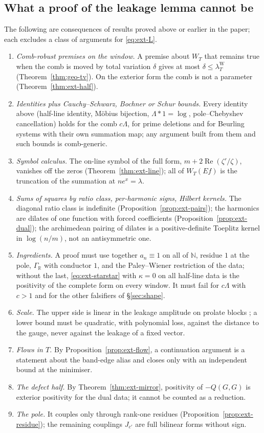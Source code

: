 \documentclass[11pt]{amsart}
\theoremstyle{definition}
\theoremstyle{remark}
\newcommand{\R}{\mathbb R}
\newcommand{\N}{\mathbb N}
\newcommand{\Rel}{\operatorname{Re}}
\newcommand{\lamW}{\lambda^{\mathrm W}_T}
\begin{document}
\subsection{What a proof of the leakage lemma cannot be}\label{subsec:ext-constraints}

The following are consequences of results proved above or earlier in the paper; each excludes a class of arguments for
\eqref{eq:ext-L}.
\begin{enumerate}
\item \emph{Comb-robust premises on the window.} A premise about $W_T$ that remains true when the comb is moved by total
variation $\delta$ gives at most $\delta\le\lamW$ (Theorem~\ref{thm:geo-tv}). On the exterior form the comb is not a parameter
(Theorem~\ref{thm:ext-half}).
\item \emph{Identities plus Cauchy--Schwarz, Bochner or Schur bounds.} Every identity above (half-line identity, M\"obius
bijection, $\Lambda*1=\log$, pole--Chebyshev cancellation) holds for the comb $c\Lambda$, for prime deletions and for
Beurling systems with their own summation map; any argument built from them and such bounds is comb-generic.
\item \emph{Symbol calculus.} The on-line symbol of the full form, $m+2\Rel(\zeta'/\zeta)$, vanishes off the zeros
(Theorem~\ref{thm:ext-line}); all of $W_T(Ef)$ is the truncation of the summation at $ne^x=\lambda$.
\item \emph{Sums of squares by ratio class, per-harmonic signs, Hilbert kernels.} The diagonal ratio class is indefinite
(Proposition~\ref{prop:ext-pairs}); the harmonics are dilates of one function with forced coefficients
(Proposition~\ref{prop:ext-dual}); the archimedean pairing of dilates is a positive-definite Toeplitz kernel in $\log(n/m)$, not
an antisymmetric one.
\item \emph{Ingredients.} A proof must use together $a_n\equiv1$ on all of $\N$, residue $1$ at the pole, $\Gamma_\R$ with
conductor $1$, and the Paley--Wiener restriction of the data; without the last, \eqref{eq:ext-starstar} with $\kappa=0$ on all
half-line data is the positivity of the complete form on every window. It must fail for $c\Lambda$ with $c>1$ and for the
other falsifiers of \S\ref{sec:shape}.
\item \emph{Scale.} The upper side is linear in the leakage amplitude on prolate blocks \cite[Thm.~1.6]{Guo2026}; a lower bound
must be quadratic, with polynomial loss, against the distance to the gauge, never against the leakage of a fixed vector.
\item \emph{Flows in $T$.} By Proposition~\ref{prop:ext-flow}, a continuation argument is a statement about the band-edge alias
and closes only with an independent bound at the minimiser.
\item \emph{The defect half.} By Theorem~\ref{thm:ext-mirror}, positivity of $-Q(G,G)$ is exterior positivity for the dual data;
it cannot be counted as a reduction.
\item \emph{The pole.} It couples only through rank-one residues (Proposition~\ref{prop:ext-residue}); the remaining couplings
$J_{c'}$ are full bilinear forms without sign.
\end{enumerate}
\end{document}
